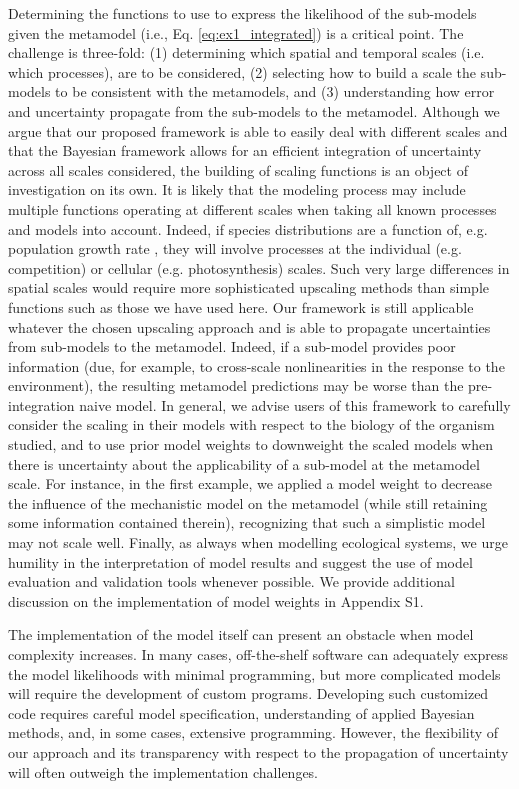 \documentclass[11pt]{article}
\begin{document}
Determining the functions to use to express the likelihood of the sub-models given the metamodel (i.e., Eq. \ref{eq:ex1_integrated}) is a critical point.
The challenge is three-fold: (1) determining which spatial and temporal scales (i.e. which processes), are to be considered, (2) selecting how to build a scale the sub-models to be consistent with the metamodels, and (3) understanding how error and uncertainty propagate from the sub-models to the metamodel. 
Although we argue that our proposed framework is able to easily deal with different scales and that the Bayesian framework allows for an efficient integration of uncertainty across all scales considered, the building of scaling functions is an object of investigation on its own. 
It is likely that the modeling process may include multiple functions operating at different scales when taking all known processes and models into account. 
Indeed, if species distributions are a function of, e.g. population growth rate \citep{Guisan2000}, they will involve processes at the individual (e.g. competition) or cellular (e.g. photosynthesis) scales. 
Such very large differences in spatial scales would require more sophisticated upscaling methods than simple functions such as those we have used here. 
Our framework is still applicable whatever the chosen upscaling approach and is able to propagate uncertainties from sub-models to the metamodel.
Indeed, if a sub-model provides poor information (due, for example, to cross-scale nonlinearities in the response to the environment), the resulting metamodel predictions may be worse than the pre-integration naive model.
In general, we advise users of this framework to carefully consider the scaling in their models with respect to the biology of the organism studied, and to use prior model weights to downweight the scaled models when there is uncertainty about the applicability of a sub-model at the metamodel scale.
For instance, in the first example, we applied a model weight to decrease the influence of the mechanistic model on the metamodel (while still retaining some information contained therein), recognizing that such a simplistic model may not scale well.
Finally, as always when modelling ecological systems, we urge humility in the interpretation of model results and suggest the use of model evaluation and validation tools whenever possible.
We provide additional discussion on the implementation of model weights in Appendix S1.

The implementation of the model itself can present an obstacle when model complexity increases. 
In many cases, off-the-shelf software can adequately express the model likelihoods with minimal programming, but more complicated models will require the development of custom programs. 
Developing such customized code requires careful model specification, understanding of applied Bayesian methods, and, in some cases, extensive programming. 
However, the flexibility of our approach and its transparency with respect to the propagation of uncertainty will often outweigh the implementation challenges.
\end{document}
